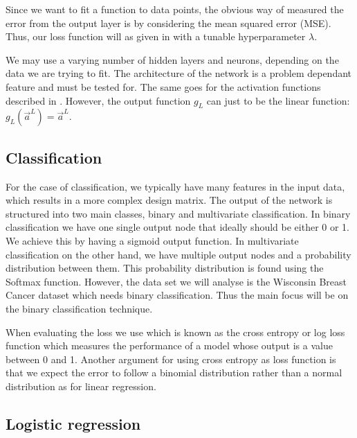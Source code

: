     Since we want to fit a function to data points, the obvious way of measured the error from the output layer is by considering the mean squared error (MSE). Thus, our loss function will as given in  with a tunable hyperparameter $\lambda$. 

    We may use a varying number of hidden layers and neurons, depending on the data we are trying to fit. The architecture of the network is a problem dependant feature and must be tested for. The same goes for the activation functions described in . However, the output function $g_L$ can just to be the linear function: $g_L(\vec{a}^L) = \vec{a}^{L}$. 
    
    

\subsection{Classification}\label{sec:classification}
    For the case of classification, we typically have many features in the input data, which results in a more complex design matrix. The output of the network is structured into two main classes, binary and multivariate classification. In binary classification we have one single output node that ideally should be either 0 or 1. We achieve this by having a sigmoid output function. In multivariate classification on the other hand, we have multiple output nodes and a probability distribution between them. This probability distribution is found using the Softmax function. However, the data set we will analyse is the Wisconsin Breast Cancer dataset \citep{scikit-learn} which needs binary classification. Thus the main focus will be on the binary classification technique. 

    When evaluating the loss we use   which is known as the cross entropy or log loss function which measures the performance of a model whose output is a value between 0 and 1. Another argument for using cross entropy as loss function is that we expect the error to follow a binomial distribution rather than a normal distribution as for linear regression.

\subsection{Logistic regression}\label{sec:logistic_regression}

